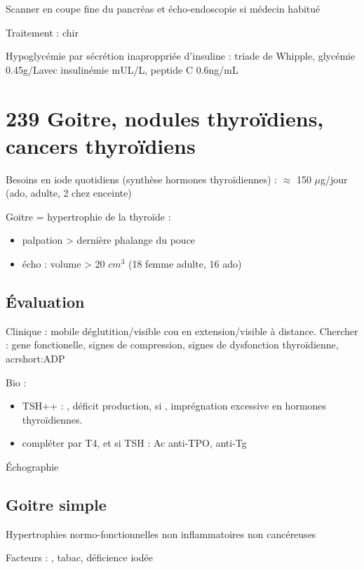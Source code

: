 \documentclass{book}
\begin{document}
Scanner en coupe fine du pancréas et écho-endoscopie si médecin habitué

Traitement : chir

\begin{tcolorbox}
Hypoglycémie par sécrétion inaproppriée d'insuline : triade de Whipple, glycémie \le 0.45g/L\footnotemark avec
insulinémie  mUL/L, peptide C \ge 0.6ng/mL
\end{tcolorbox}

\section{239 \textdagger{} Goitre, nodules thyroïdiens, cancers thyroïdiens}
\label{sec:orgf4546e5}
Besoins en iode quotidiens (synthèse hormones thyroïdiennes) :  \(\approx\) 150 \(\mu\)g/jour (ado,
  adulte, \texttimes{} 2 chez enceinte)

Goitre = hypertrophie de la thyroïde :
\begin{itemize}
\item palpation > dernière phalange du pouce
\item écho : volume > 20 \(cm^3\) (18 femme adulte, 16 ado)
\end{itemize}

\subsection{Évaluation}
\label{sec:org8a8654a}
Clinique : mobile déglutition/visible cou en extension/visible à
distance. Chercher : gene fonctionelle, signes de compression, signes de
dysfonction thyroïdienne, acrshort:ADP

Bio : 
\begin{itemize}
\item TSH++ : \inc, déficit production, si \dec, imprégnation excessive en hormones thyroïdiennes.
\item compléter par T4, et si TSH \inc : Ac anti-TPO, anti-Tg
\end{itemize}

Échographie

\subsection{Goitre simple}
\label{sec:org409a6f5}
Hypertrophies normo-fonctionnelles non inflammatoires non cancéreuses

Facteurs : \female, tabac, déficience iodée
\end{document}

